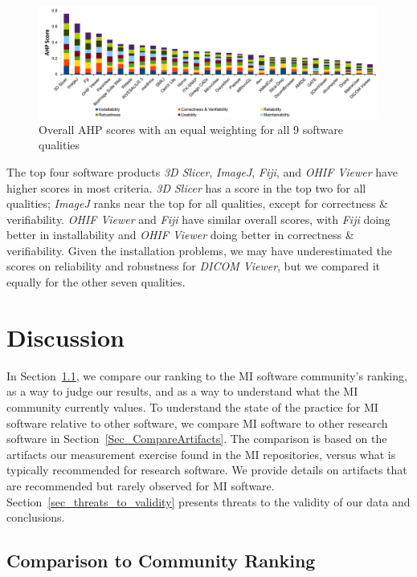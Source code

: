 \documentclass[11pt]{article}
\begin{document}
\begin{figure}[!ht]
\includegraphics[scale=0.47]{overall_scores.pdf}
\caption{Overall AHP scores with an equal weighting for all 9 software qualities}

\label{fg_overall_scores}
\end{figure}

The top four software products \textit{3D Slicer}, \textit{ImageJ},
\textit{Fiji}, and \textit{OHIF Viewer} have higher scores in most criteria.
\textit{3D Slicer} has a score in the top two for all qualities; \textit{ImageJ}
ranks near the top for all qualities, except for correctness \& verifiability.
\textit{OHIF Viewer} and \textit{Fiji} have similar overall scores, with
\textit{Fiji} doing better in installability and \textit{OHIF Viewer} doing
better in correctness \& verifiability.  Given the installation problems, we may
have underestimated the scores on reliability and robustness for \textit{DICOM
Viewer}, but we compared it equally for the other seven qualities.

\section{Discussion}

In Section~\ref{Sec_VsCommunityRanking}, we compare our ranking to the MI
software community's ranking, as a way to judge our results, and as a way to
understand what the MI community currently values. To understand the state of
the practice for MI software relative to other software, we compare MI software
to other research software in Section~\ref{Sec_CompareArtifacts}.  The
comparison is based on the artifacts our measurement exercise found in the MI
repositories, versus what is typically recommended for research software.  We
provide details on artifacts that are recommended but rarely observed for MI
software. Section~\ref{sec_threats_to_validity} presents threats to the validity
of our data and conclusions.

\subsection{Comparison to Community Ranking} \label{Sec_VsCommunityRanking}
\end{document}
